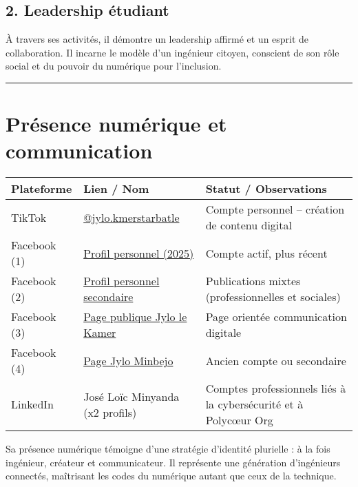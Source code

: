 \documentclass[12pt]{article}
\begin{document}
\subsection*{2. Leadership étudiant}
À travers ses activités, il démontre un leadership affirmé et un esprit de collaboration.  
Il incarne le modèle d’un ingénieur citoyen, conscient de son rôle social et du pouvoir du numérique pour l’inclusion.

\vspace{0.5cm}
\hrule
\vspace{0.5cm}

\section*{Présence numérique et communication}

\begin{center}
\begin{tabular}{|p{3cm}|p{8cm}|p{4cm}|}
\hline
\textbf{Plateforme} & \textbf{Lien / Nom} & \textbf{Statut / Observations} \\
\hline
TikTok & \href{https://vm.tiktok.com/ZMHvYLAsUXAqn-XRm8Y/}{@jylo.kmerstarbatle} & Compte personnel – création de contenu digital \\
\hline
Facebook (1) & \href{https://www.facebook.com/profile.php?id=61558227841643}{Profil personnel (2025)} & Compte actif, plus récent \\
\hline
Facebook (2) & \href{https://www.facebook.com/profile.php?id=61575315117309}{Profil personnel secondaire} & Publications mixtes (professionnelles et sociales) \\
\hline
Facebook (3) & \href{https://www.facebook.com/jlolekamer}{Page publique Jylo le Kamer} & Page orientée communication digitale \\
\hline
Facebook (4) & \href{https://www.facebook.com/jylo.minbejo}{Page Jylo Minbejo} & Ancien compte ou secondaire \\
\hline
LinkedIn & José Loïc Minyanda (x2 profils) & Comptes professionnels liés à la cybersécurité et à Polycœur Org \\
\hline
\end{tabular}
\end{center}

\vspace{0.5cm}
Sa présence numérique témoigne d’une stratégie d’identité plurielle : à la fois ingénieur, créateur et communicateur.  
Il représente une génération d’ingénieurs connectés, maîtrisant les codes du numérique autant que ceux de la technique.
\end{document}
